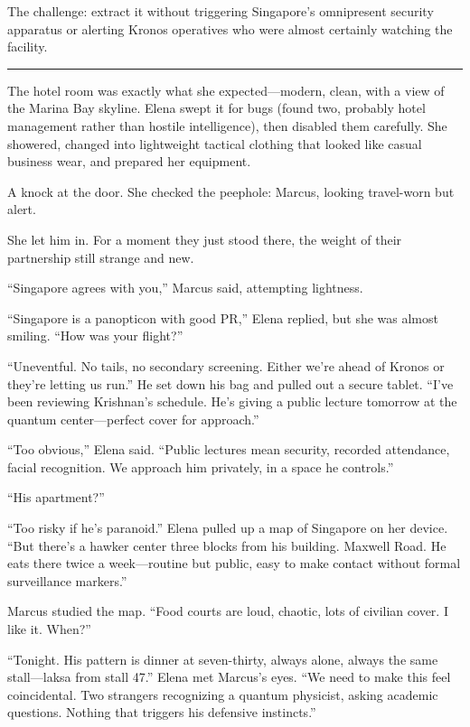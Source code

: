 The challenge: extract it without triggering Singapore's omnipresent security apparatus or alerting Kronos operatives who were almost certainly watching the facility.

\begin{center}\rule{0.5\linewidth}{0.5pt}\end{center}

The hotel room was exactly what she expected---modern, clean, with a view of the Marina Bay skyline. Elena swept it for bugs (found two, probably hotel management rather than hostile intelligence), then disabled them carefully. She showered, changed into lightweight tactical clothing that looked like casual business wear, and prepared her equipment.

A knock at the door. She checked the peephole: Marcus, looking travel-worn but alert.

She let him in. For a moment they just stood there, the weight of their partnership still strange and new.

``Singapore agrees with you,'' Marcus said, attempting lightness.

``Singapore is a panopticon with good PR,'' Elena replied, but she was almost smiling. ``How was your flight?''

``Uneventful. No tails, no secondary screening. Either we're ahead of Kronos or they're letting us run.'' He set down his bag and pulled out a secure tablet. ``I've been reviewing Krishnan's schedule. He's giving a public lecture tomorrow at the quantum center---perfect cover for approach.''

``Too obvious,'' Elena said. ``Public lectures mean security, recorded attendance, facial recognition. We approach him privately, in a space he controls.''

``His apartment?''

``Too risky if he's paranoid.'' Elena pulled up a map of Singapore on her device. ``But there's a hawker center three blocks from his building. Maxwell Road. He eats there twice a week---routine but public, easy to make contact without formal surveillance markers.''

Marcus studied the map. ``Food courts are loud, chaotic, lots of civilian cover. I like it. When?''

``Tonight. His pattern is dinner at seven-thirty, always alone, always the same stall---laksa from stall 47.'' Elena met Marcus's eyes. ``We need to make this feel coincidental. Two strangers recognizing a quantum physicist, asking academic questions. Nothing that triggers his defensive instincts.''

